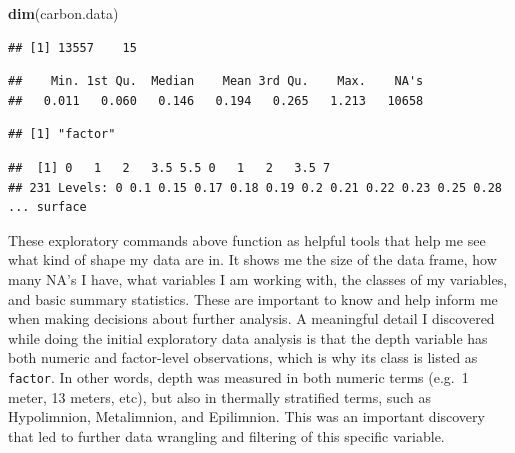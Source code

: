 \documentclass[12pt,]{article}
\newenvironment{Shaded}{\begin{snugshade}}{\end{snugshade}}
\newcommand{\KeywordTok}[1]{\textcolor[rgb]{0.13,0.29,0.53}{\textbf{#1}}}
\newcommand{\DecValTok}[1]{\textcolor[rgb]{0.00,0.00,0.81}{#1}}
\newcommand{\OperatorTok}[1]{\textcolor[rgb]{0.81,0.36,0.00}{\textbf{#1}}}
\newcommand{\NormalTok}[1]{#1}
\begin{document}
\begin{Shaded}
\begin{Highlighting}[]
\KeywordTok{dim}\NormalTok{(carbon.data)}
\end{Highlighting}
\end{Shaded}

\begin{verbatim}
## [1] 13557    15
\end{verbatim}

\begin{Shaded}
\end{Shaded}

\begin{verbatim}
##    Min. 1st Qu.  Median    Mean 3rd Qu.    Max.    NA's 
##   0.011   0.060   0.146   0.194   0.265   1.213   10658
\end{verbatim}

\begin{Shaded}
\end{Shaded}

\begin{verbatim}
## [1] "factor"
\end{verbatim}

\begin{Shaded}
\end{Shaded}

\begin{verbatim}
##  [1] 0   1   2   3.5 5.5 0   1   2   3.5 7  
## 231 Levels: 0 0.1 0.15 0.17 0.18 0.19 0.2 0.21 0.22 0.23 0.25 0.28 ... surface
\end{verbatim}

These exploratory commands above function as helpful tools that help me
see what kind of shape my data are in. It shows me the size of the data
frame, how many NA's I have, what variables I am working with, the
classes of my variables, and basic summary statistics. These are
important to know and help inform me when making decisions about further
analysis. A meaningful detail I discovered while doing the initial
exploratory data analysis is that the depth variable has both numeric
and factor-level observations, which is why its class is listed as
\texttt{factor}. In other words, depth was measured in both numeric
terms (e.g.~1 meter, 13 meters, etc), but also in thermally stratified
terms, such as Hypolimnion, Metalimnion, and Epilimnion. This was an
important discovery that led to further data wrangling and filtering of
this specific variable.
\end{document}
